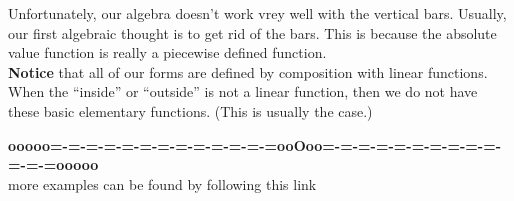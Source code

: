 \documentclass{ximera}
\begin{document}
Unfortunately, our algebra doesn't work vrey well with the vertical bars.  Usually, our first algebraic thought is to get rid of the bars.  This is because the absolute value function is really a piecewise defined function.   \\



\textbf{Notice} that all of our forms are defined by composition with linear functions.  \\

When the ``inside'' or ``outside'' is not a linear function, then we do not have these basic elementary functions. (This is usually the case.)


























\begin{center}
\textbf{\textcolor{green!50!black}{ooooo=-=-=-=-=-=-=-=-=-=-=-=-=ooOoo=-=-=-=-=-=-=-=-=-=-=-=-=ooooo}} \\

more examples can be found by following this link\\ 

\end{center}
\end{document}
